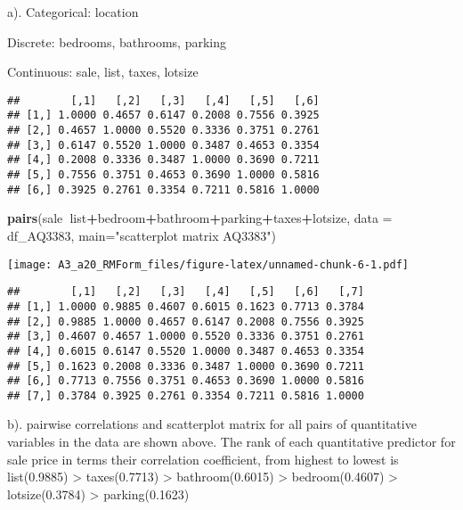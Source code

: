 \documentclass[
]{article}
\newenvironment{Shaded}{\begin{snugshade}}{\end{snugshade}}
\newcommand{\DataTypeTok}[1]{\textcolor[rgb]{0.13,0.29,0.53}{#1}}
\newcommand{\DecValTok}[1]{\textcolor[rgb]{0.00,0.00,0.81}{#1}}
\newcommand{\KeywordTok}[1]{\textcolor[rgb]{0.13,0.29,0.53}{\textbf{#1}}}
\newcommand{\NormalTok}[1]{#1}
\newcommand{\OperatorTok}[1]{\textcolor[rgb]{0.81,0.36,0.00}{\textbf{#1}}}
\newcommand{\StringTok}[1]{\textcolor[rgb]{0.31,0.60,0.02}{#1}}
\begin{document}
a). Categorical: location

Discrete: bedrooms, bathrooms, parking

Continuous: sale, list, taxes, lotsize

\begin{verbatim}
##        [,1]   [,2]   [,3]   [,4]   [,5]   [,6]
## [1,] 1.0000 0.4657 0.6147 0.2008 0.7556 0.3925
## [2,] 0.4657 1.0000 0.5520 0.3336 0.3751 0.2761
## [3,] 0.6147 0.5520 1.0000 0.3487 0.4653 0.3354
## [4,] 0.2008 0.3336 0.3487 1.0000 0.3690 0.7211
## [5,] 0.7556 0.3751 0.4653 0.3690 1.0000 0.5816
## [6,] 0.3925 0.2761 0.3354 0.7211 0.5816 1.0000
\end{verbatim}

\begin{Shaded}
\begin{Highlighting}[]
\KeywordTok{pairs}\NormalTok{(sale}\OperatorTok{~}\NormalTok{list}\OperatorTok{+}\NormalTok{bedroom}\OperatorTok{+}\NormalTok{bathroom}\OperatorTok{+}\NormalTok{parking}\OperatorTok{+}\NormalTok{taxes}\OperatorTok{+}\NormalTok{lotsize, }\DataTypeTok{data =}\NormalTok{ df_AQ3383, }\DataTypeTok{main=}\StringTok{"scatterplot matrix AQ3383"}\NormalTok{)}
\end{Highlighting}
\end{Shaded}

\texttt{[image: A3\_a20\_RMForm\_files/figure-latex/unnamed-chunk-6-1.pdf]}

\begin{Shaded}
\end{Shaded}

\begin{verbatim}
##        [,1]   [,2]   [,3]   [,4]   [,5]   [,6]   [,7]
## [1,] 1.0000 0.9885 0.4607 0.6015 0.1623 0.7713 0.3784
## [2,] 0.9885 1.0000 0.4657 0.6147 0.2008 0.7556 0.3925
## [3,] 0.4607 0.4657 1.0000 0.5520 0.3336 0.3751 0.2761
## [4,] 0.6015 0.6147 0.5520 1.0000 0.3487 0.4653 0.3354
## [5,] 0.1623 0.2008 0.3336 0.3487 1.0000 0.3690 0.7211
## [6,] 0.7713 0.7556 0.3751 0.4653 0.3690 1.0000 0.5816
## [7,] 0.3784 0.3925 0.2761 0.3354 0.7211 0.5816 1.0000
\end{verbatim}

b). pairwise correlations and scatterplot matrix for all pairs of
quantitative variables in the data are shown above. The rank of each
quantitative predictor for sale price in terms their correlation
coefficient, from highest to lowest is list(0.9885) \textgreater{}
taxes(0.7713) \textgreater{} bathroom(0.6015) \textgreater{}
bedroom(0.4607) \textgreater{} lotsize(0.3784) \textgreater{}
parking(0.1623)
\end{document}
